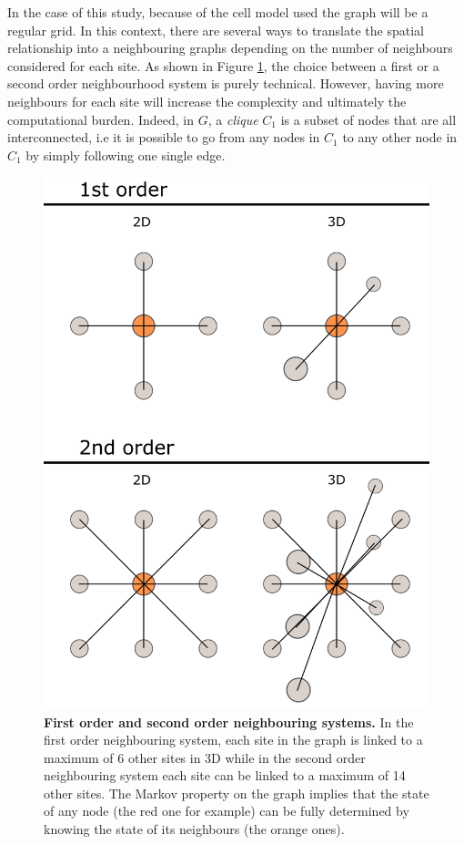 In the case of this study, because of the cell model used the graph will be a regular grid. In this context, there are several ways to translate the spatial relationship into a neighbouring graphs depending on the number of neighbours considered for each site. As shown in Figure \ref{fig:graph}, the choice between a first or a second order neighbourhood system is purely technical. However, having more neighbours for each site will increase the complexity and ultimately the computational burden. Indeed, in $G$, a \emph{clique} $C_1$ is a subset of nodes that are all interconnected, i.e it is possible to go from any nodes in $C_1$ to any other node in $C_1$ by simply following one single edge.\\

	\begin{figure}[h]
\centerline{\includegraphics[width=0.8\linewidth]{gfx/chapter4/graph.png}}
\caption{{\bf First order and second order neighbouring systems.} In the first order neighbouring system, each site in the graph is linked to a maximum of 6 other sites in 3D while in the second order neighbouring system each site can be linked to a maximum of 14 other sites. The Markov property on the graph implies that the state of any node (the red one for example) can be fully determined by knowing the state of its neighbours (the orange ones).}\label{fig:graph}
	\end{figure}

